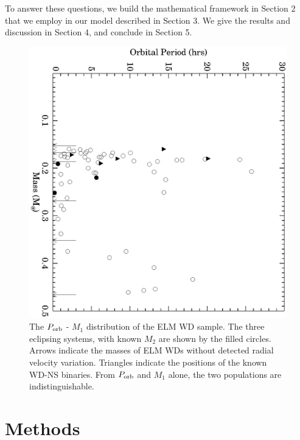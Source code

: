 \documentclass[letterpaper,12pt,preprint]{aastex}
\begin{document}
To answer these questions, we build the mathematical framework in Section 2 that we employ in our model described in Section 3. We give the results and discussion in Section 4, and conclude in Section 5.

\begin{figure}[h!]
\begin{center}
\includegraphics[angle=90,width=0.95\columnwidth]{Porb_M1.eps}
\caption{The $P_{\rm orb}$ - $M_1$ distribution of the ELM WD sample. The three eclipsing systems, with known $M_2$ are shown by the filled circles. Arrows indicate the masses of ELM WDs without detected radial velocity variation. Triangles indicate the positions of the known WD-NS binaries. From $P_{\rm orb}$ and $M_1$ alone, the two populations are indistinguishable.}
\end{center}
\end{figure}




\section{Methods}
\end{document}
